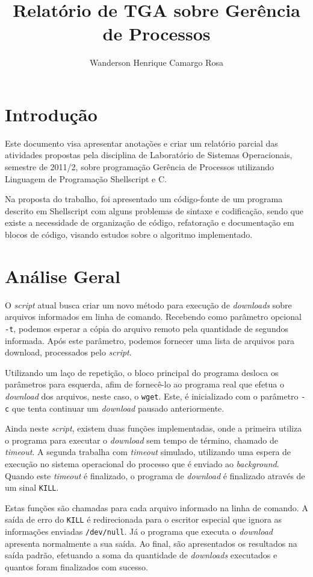 \documentclass{article}
\title{Relatório de TGA sobre Gerência de Processos}
\author{Wanderson Henrique Camargo Rosa\inst{1}}
\begin{document}
\maketitle{}

\section{Introdução}

Este documento visa apresentar anotações e criar um relatório parcial das
atividades propostas pela disciplina de Laboratório de Sistemas Operacionais,
semestre de 2011/2, sobre programação Gerência de Processos utilizando Linguagem
de Programação Shellscript e C.

Na proposta do trabalho, foi apresentado um código-fonte de um programa descrito
em Shellscript com alguns problemas de sintaxe e codificação, sendo que existe a
necessidade de organização de código, refatoração e documentação em blocos de
código, visando estudos sobre o algoritmo implementado.

\section{Análise Geral}

O \textit{script} atual busca criar um novo método para execução de
\textit{downloads} sobre arquivos informados em linha de comando. Recebendo como
parâmetro opcional \texttt{-t}, podemos esperar a cópia do arquivo remoto pela
quantidade de segundos informada. Após este parâmetro, podemos fornecer uma
lista de arquivos para download, processados pelo \textit{script}.

Utilizando um laço de repetição, o bloco principal do programa desloca os
parâmetros para esquerda, afim de fornecê-lo ao programa real que efetua o
\textit{download} dos arquivos, neste caso, o \texttt{wget}. Este, é
inicializado com o parâmetro \texttt{-c} que tenta continuar um
\textit{download} pausado anteriormente.

Ainda neste \textit{script}, existem duas funções implementadas, onde a primeira
utiliza o programa para executar o \textit{download} sem tempo de término,
chamado de \textit{timeout}. A segunda trabalha com \textit{timeout} simulado,
utilizando uma espera de execução no sistema operacional do processo que é
enviado ao \textit{background}. Quando este \textit{timeout} é finalizado, o
programa de \textit{download} é finalizado através de um sinal \texttt{KILL}.

Estas funções são chamadas para cada arquivo informado na linha de comando. A
saída de erro do \texttt{KILL} é redirecionada para o escritor especial que
ignora as informações enviadas \texttt{/dev/null}. Já o programa que executa o
\textit{download} apresenta normalmente a sua saída. Ao final, são apresentados
os resultados na saída padrão, efetuando a soma da quantidade de
\textit{downloads} executados e quantos foram finalizados com sucesso.
\end{document}
